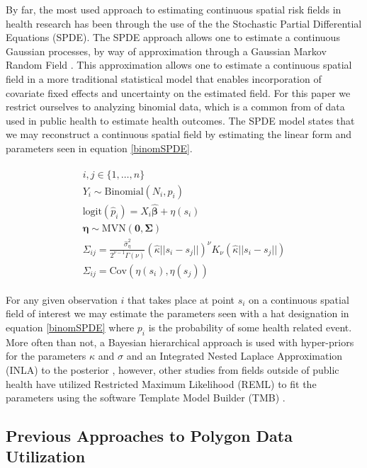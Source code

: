 \documentclass{article}
\begin{document}
By far, the most used approach to estimating continuous spatial risk fields in health research has been through the use of the the Stochastic Partial Differential Equations (SPDE). The SPDE approach allows one to estimate a continuous Gaussian processes, by way of approximation through a Gaussian Markov Random Field \cite{Lindgren2011}. This approximation allows one to estimate a continuous spatial field in a more traditional statistical model that enables incorporation of covariate fixed effects and uncertainty on the estimated field. For this paper we restrict ourselves to analyzing binomial data, which is a common from of data used in public health to estimate health outcomes. The SPDE model states that we may reconstruct a continuous spatial field by estimating the linear form and parameters seen in equation \ref{binomSPDE}.

\begin{align}\label{binomSPDE}\begin{split}
    i,j \in \{1, \dots, n\}\\
    Y_i \sim \text{Binomial}(N_i, \hat{p}_i) \\
    \text{logit}(\hat{p}_i) = X_i \hat{\boldsymbol{\beta}} + \eta(s_i)  \\
    \boldsymbol{\eta} \sim \text{MVN}(\boldsymbol{0}, \boldsymbol{\Sigma}) \\
    \Sigma_{ij} = \frac{\hat{\sigma}^2_\eta}{2^{\nu-1} \Gamma(\nu)}
        (\hat{\kappa} ||s_i - s_j||)^\nu K_\nu(\hat{\kappa} ||s_i - s_j||) \\
    \Sigma_{ij} = \text{Cov}(\eta(s_i) , \eta(s_j))
\end{split}\end{align}

For any given observation $i$ that takes place at point $s_i$ on a continuous spatial field of interest we may estimate the parameters seen with a hat designation in equation \ref{binomSPDE} where $p_i$ is the probability of some health related event. More often than not, a Bayesian hierarchical approach is used with hyper-priors for the parameters $\kappa$ and $\sigma$ \cite{Burke2016, Reiner2018, Utazi2018a, Wakefield2017} and an Integrated Nested Laplace Approximation (INLA) to the posterior \cite{Rue2009}, however, other studies from fields outside of public health have utilized Restricted Maximum Likelihood (REML) to fit the parameters \cite{Gruss2018} using the software Template Model Builder (TMB) \cite{Kristensen2016a}.

\subsection{Previous Approaches to Polygon Data Utilization}
\end{document}
